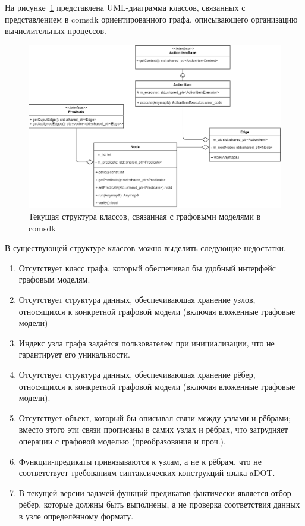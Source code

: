 \def\notedate{2022.03.09}
\def\currentauthor{Тришин И.В. (РК6)}

На рисунке~\ref{fig:oldGraphStructure} представлена UML-диаграмма классов, связанных с представлением в comsdk ориентированного графа, описывающего организацию вычислительных процессов.

\begin{figure}[H]
    \includegraphics[width=\textwidth]{ResearchNotes/rndhpc_not_blo_2022_03_09/structure.png}
    \caption{Текущая структура классов, связанная с графовыми моделями в comsdk}\label{fig:oldGraphStructure}
\end{figure}

В существующей структуре классов можно выделить следующие недостатки.
\begin{enumerate}
    \item Отсутствует класс графа, который обеспечивал бы удобный интерфейс графовым моделям.
    \item Отсутствует структура данных, обеспечивающая хранение узлов, относящихся к конкретной графовой модели (включая вложенные графовые модели)%
    \item Индекс узла графа задаётся пользователем при инициализации, что не гарантирует его уникальности.
    \item Отсутствует структура данных, обеспечивающая хранение рёбер, относящихся к конкретной графовой модели (включая вложенные графовые модели). %
    \item Отсутствует объект, который бы описывал связи между узлами и рёбрами; вместо этого эти связи прописаны в самих узлах и рёбрах, что затрудняет операции с графовой моделью (преобразования и проч.).
    \item Функции-предикаты привязываются к узлам, а не к рёбрам, что не соответствует требованиям синтаксических конструкций языка \gls{aDOT}.
    \item В текущей версии задачей функций-предикатов фактически является отбор рёбер, которые должны быть выполнены, а не проверка соответствия данных в узле определённому формату.
\end{enumerate}

\noteattributes{}
